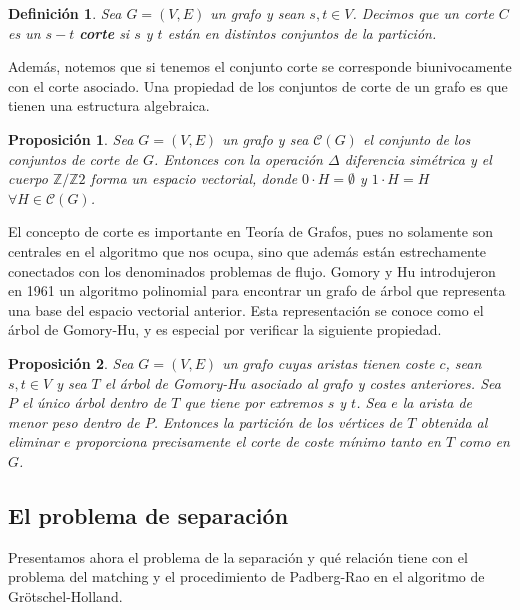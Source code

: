 \documentclass[twoside,a4paper,openright,12pt,tikz]{book}
\newtheorem{defi}{Definici\'on}[section]
\newtheorem{prop}{Proposici\'on}[section]
\newcommand{\Z}{\mathbb{Z}}
\begin{document}
\begin{defi}
Sea $G=(V,E)$ un grafo y sean $s,t\in V$. Decimos que un corte $C$ es un $s-t$ \textbf{corte} si $s$ y $t$ están en distintos conjuntos de la partición. 
\end{defi}

Además, notemos que si tenemos el conjunto corte se corresponde biunivocamente con el corte asociado. Una propiedad de los conjuntos de corte de un grafo es que tienen una estructura algebraica.



\begin{prop}
Sea $G=(V,E)$ un grafo y sea $\mathcal{C}(G)$ el conjunto de los conjuntos de corte de $G$. Entonces con la operación $\Delta$ diferencia simétrica y el cuerpo $\Z/\Z2$ forma un espacio vectorial, donde $0\cdot H = \emptyset$ y $1\cdot H = H$ $\forall H \in \mathcal{C}(G)$.
\end{prop}

El concepto de corte es importante en Teoría de Grafos, pues no solamente son centrales en el algoritmo que nos ocupa, sino que además están estrechamente conectados con los denominados problemas de flujo.  Gomory y Hu introdujeron en 1961 un algoritmo polinomial para encontrar un grafo de árbol que representa una base del espacio vectorial anterior. Esta representación se conoce como el árbol de Gomory-Hu, y es especial por verificar la siguiente propiedad.

\begin{prop}
Sea $G=(V,E)$ un grafo cuyas aristas tienen coste $c$, sean $s,t\in V$ y sea $T$ el árbol de Gomory-Hu asociado al grafo y costes anteriores. Sea $P$ el único árbol dentro de $T$ que tiene por extremos $s$ y $t$. Sea $e$ la arista de menor peso dentro de $P$. Entonces la partición de los vértices de $T$ obtenida al eliminar $e$ proporciona precisamente el corte de coste mínimo tanto en $T$ como en $G$.
\end{prop}
\subsection{El problema de separación}

Presentamos ahora el problema de la separación y qué relación tiene con el problema del matching y el procedimiento de Padberg-Rao en el algoritmo de Grötschel-Holland. 
\end{document}
